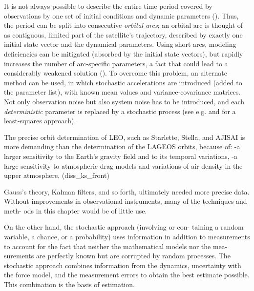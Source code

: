 It is not always possible to describe the entire time period covered by observations 
by one set of initial conditions and dynamic parameters (\cite{BeutlerVII}). Thus,
the period can be split into consecutive \emph{orbital arcs}; an orbital arc is 
thought of as contiguous, limited part of the satellite's trajectory, described by 
exactly one initial state vector and the dynamical parameters. Using short arcs, 
modeling deficiencies can be mitigated (absorbed by the initial state vectors),
but rapidly increases the number of arc-speciﬁc parameters, a fact that could lead 
to a considerably weakened solution (\cite{BeutlerVII}). To overcome this problem, 
an alternate method can be used, in which stochastic accelerations are introduced 
(added to the parameter list), with known mean values and variance-covariance matrices.
Not only observation noise but also system noise has to be introduced, and each 
\emph{deterministic} parameter is replaced by a stochastic process (see e.g. \cite{Jaggi2005b} 
and \cite{Jaggi2005a} for a least-squares approach).

\iffalse
The precise orbit determination of LEO, such as Starlette, Stella, and AJISAI is more
demanding than the determination of the LAGEOS orbits, because of:
-a larger sensitivity to the Earth’s gravity field and to its temporal variations,
-a large sensitivity to atmospheric drag models and variations of air density in the
upper atmosphere, (diss_ks_front)

Gauss’s theory, Kalman filters, and so forth, ultimately needed more precise data.
Without improvements in observational instruments, many of the techniques and meth-
ods in this chapter would be of little use.

On the other hand, the stochastic approach (involving or con-
taining a random variable, a chance, or a probability) uses information in addition to
measurements to account for the fact that neither the mathematical models nor the mea-
surements are perfectly known but are corrupted by random processes. The stochastic
approach combines information from the dynamics, uncertainty with the force model,
and the measurement errors to obtain the best estimate possible. This combination is the
basis of estimation.

